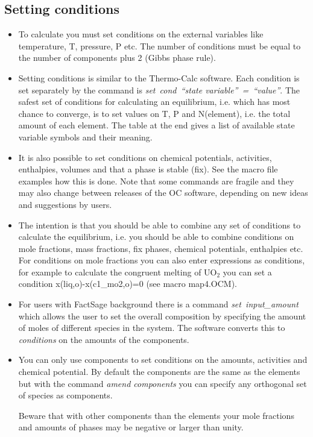 \documentclass[12pt]{article}
\begin{document}
\subsection{Setting conditions}

\begin{itemize}
\item To calculate you must set conditions on the external variables
  like temperature, T, pressure, P etc.  The number of conditions must
  be equal to the number of components plus 2 (Gibbs phase rule).

\item Setting conditions is similar to the Thermo-Calc software.  Each
  condition is set separately by the command is {\em set~cond~``state
    variable''~=~``value''}.  The safest set of conditions for
  calculating an equilibrium, i.e. which has most chance to converge,
  is to set values on T, P and N(element), i.e. the total amount of
  each element.  The table at the end gives a list of available state
  variable symbols and their meaning.

\item It is also possible to set conditions on chemical potentials,
  activities, enthalpies, volumes and that a phase is stable (fix).
  See the macro file examples how this is done.  Note that some
  commands are fragile and they may also change between releases of
  the OC software, depending on new ideas and suggestions by users.

\item The intention is that you should be able to combine any set of
  conditions to calculate the equilibrium, i.e. you should be able to
  combine conditions on mole fractions, mass fractions, fix phases,
  chemical potentials, enthalpies etc.  For conditions on mole
  fractions you can also enter expressions as conditions, for example
  to calculate the congruent melting of UO$_2$ you can set a condition
  x(liq,o)-x(c1\_mo2,o)=0 (see macro map4.OCM).

\item For users with FactSage background there is a command {\em
  set~input\_amount} which allows the user to set the overall
  composition by specifying the amount of moles of different species
  in the system.  The software converts this to {\em conditions} on the
  amounts of the components.

\item You can only use components to set conditions on the amounts,
  activities and chemical potential.   By default the components are
  the same as the elements but with the command {\em amend components}
  you can specify any orthogonal set of species as components.

  Beware that with other components than the elements your mole
  fractions and amounts of phases may be negative or larger than
  unity.

\end{itemize}
\end{document}
